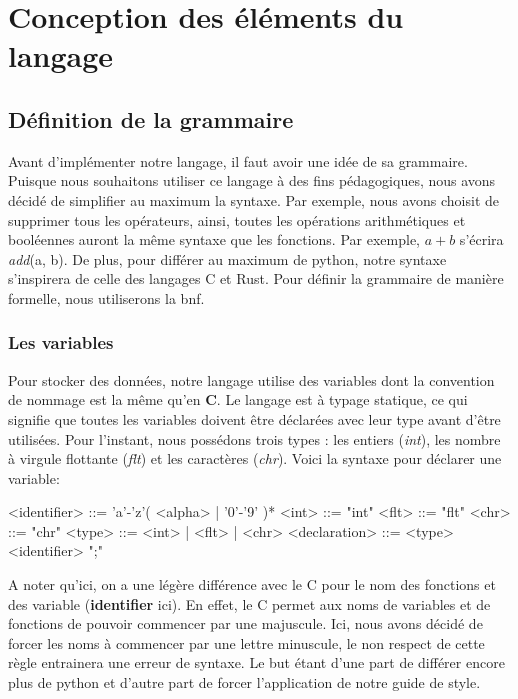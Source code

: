 \documentclass[a4paper]{article}%
\begin{document}
\section{Conception des éléments du langage}

\subsection{Définition de la grammaire}

Avant d'implémenter notre langage, il faut avoir une idée de sa grammaire.
Puisque nous souhaitons utiliser ce langage à des fins pédagogiques, nous avons
décidé de simplifier au maximum la syntaxe. Par exemple, nous avons choisit de
supprimer tous les opérateurs, ainsi, toutes les opérations arithmétiques et
booléennes auront la même syntaxe que les fonctions. Par exemple, $a+b$ s'écrira
\textit{add}(a, b). De plus, pour différer au maximum de python, notre syntaxe
s'inspirera de celle des langages C et Rust. Pour définir la grammaire de
manière formelle, nous utiliserons la \gls{bnf}.

\subsubsection*{Les variables}

Pour stocker des données, notre langage utilise des variables dont la
convention de nommage est la même qu'en \textbf{C}. Le langage est à typage
statique, ce qui signifie que toutes les variables doivent être déclarées avec
leur type avant d'être utilisées. Pour l'instant, nous possédons trois types :
les entiers (\textit{int}), les nombre à virgule flottante (\textit{flt}) et les
caractères (\textit{chr}). Voici la syntaxe pour déclarer une variable:

\begin{grammar}
<identifier> ::= 'a'-'z'( <alpha> | '0'-'9' )*
<int> ::= "int"
<flt> ::= "flt"
<chr> ::= "chr"
<type> ::= <int> | <flt> | <chr>
<declaration> ::= <type> <identifier> ";"
\end{grammar}\leavevmode\newline

A noter qu'ici, on a une légère différence avec le C pour le nom des fonctions
et des variable (\textbf{identifier} ici). En effet, le C permet aux noms de
variables et de fonctions de pouvoir commencer par une majuscule. Ici, nous
avons décidé de forcer les noms à commencer par une lettre minuscule, le non
respect de cette règle entrainera une erreur de syntaxe. Le but étant d'une part
de différer encore plus de python et d'autre part de forcer l'application de
notre guide de style.
\end{document}
